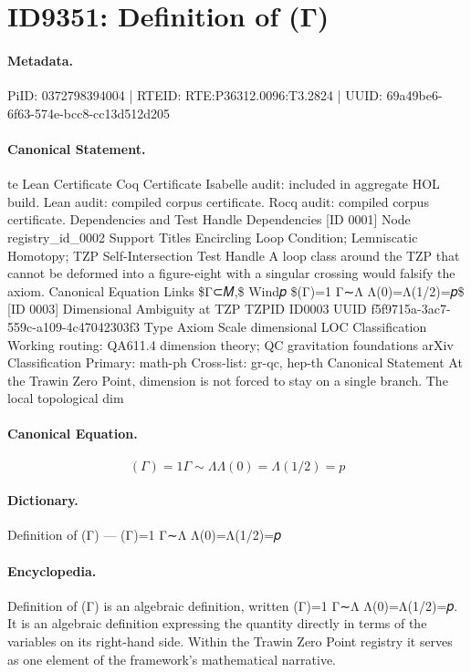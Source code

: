 \section*{ID9351: Definition of (Γ)}
\paragraph{Metadata.}
PiID: 0372798394004 | RTEID: RTE:P36312.0096:T3.2824 | UUID: 69a49be6-6f63-574e-bcc8-cc13d512d205

\paragraph{Canonical Statement.}
te Lean Certificate Coq Certificate Isabelle audit: included in aggregate HOL build. Lean audit: compiled corpus certificate. Rocq audit: compiled corpus certificate. Dependencies and Test Handle Dependencies [ID 0001] Node registry\_id\_0002 Support Titles Encircling Loop Condition; Lemniscatic Homotopy; TZP Self-Intersection Test Handle A loop class around the TZP that cannot be deformed into a figure-eight with a singular crossing would falsify the axiom. Canonical Equation Links \$Γ⊂𝑀,\$ Wind𝑝 \$(Γ)=1 Γ∼Λ Λ(0)=Λ(1/2)=𝑝\$ [ID 0003] Dimensional Ambiguity at TZP TZPID ID0003 UUID f5f9715a-3ac7-559c-a109-4c47042303f3 Type Axiom Scale dimensional LOC Classification Working routing: QA611.4 dimension theory; QC gravitation foundations arXiv Classification Primary: math-ph Cross-list: gr-qc, hep-th Canonical Statement At the Trawin Zero Point, dimension is not forced to stay on a single branch. The local topological dim

\paragraph{Canonical Equation.}
\[
(Γ)=1 Γ∼Λ Λ(0)=Λ(1/2)=𝑝
\]

\paragraph{Dictionary.}
Definition of (Γ) — (Γ)=1 Γ∼Λ Λ(0)=Λ(1/2)=𝑝

\paragraph{Encyclopedia.}
Definition of (Γ) is an algebraic definition, written (Γ)=1 Γ∼Λ Λ(0)=Λ(1/2)=𝑝. It is an algebraic definition expressing the quantity directly in terms of the variables on its right-hand side. Within the Trawin Zero Point registry it serves as one element of the framework's mathematical narrative.
